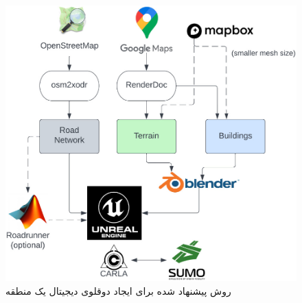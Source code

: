\begin{figure}[h!]
	\centering
	\includegraphics[width=0.75\linewidth]{figures/Digital_Twin_Procedure.png}
	\caption{   روش پیشنهاد شده برای ایجاد دوقلوی دیجیتال یک منطقه \cite{azfar2022efficient}}
	\label{fig:dt_procedure_1}
\end{figure}


